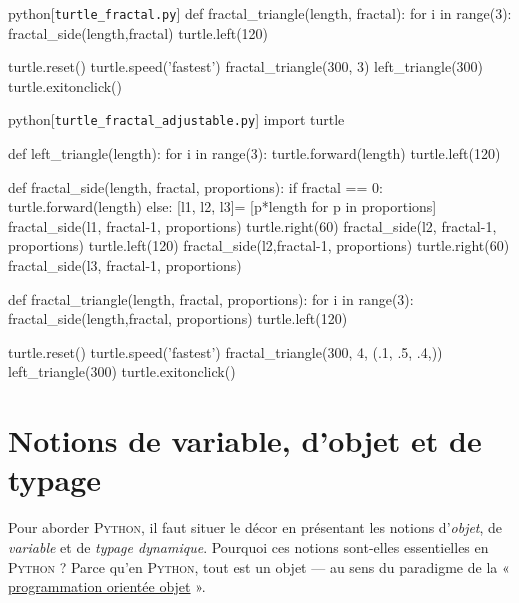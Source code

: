 \begin{solution}[ID=4]
\begin{listing}{python}[\texttt{turtle\_fractal.py}]
def fractal_triangle(length, fractal):
    for i in range(3):
        fractal_side(length,fractal)
        turtle.left(120)

turtle.reset()
turtle.speed('fastest')
fractal_triangle(300, 3)
left_triangle(300)
turtle.exitonclick()
\end{listing}

\begin{listing}{python}[\texttt{turtle\_fractal\_adjustable.py}]
import turtle

def left_triangle(length):
    for i in range(3):
        turtle.forward(length)
        turtle.left(120)

def fractal_side(length, fractal, proportions):
    if fractal == 0:
        turtle.forward(length)
    else:
        [l1, l2, l3]= [p*length for p in proportions]
        fractal_side(l1, fractal-1, proportions)
        turtle.right(60)
        fractal_side(l2, fractal-1, proportions)
        turtle.left(120)
        fractal_side(l2,fractal-1, proportions)
        turtle.right(60)
        fractal_side(l3, fractal-1, proportions)

def fractal_triangle(length, fractal, proportions):
    for i in range(3):
        fractal_side(length,fractal, proportions)
        turtle.left(120)

turtle.reset()
turtle.speed('fastest')
fractal_triangle(300, 4, (.1, .5, .4,))
left_triangle(300)
turtle.exitonclick()
\end{listing}
\end{solution}





\section[Variables, objets et typage]{Notions de variable, d'objet et de typage}
\label{sec:X.2}


Pour aborder \textsc{Python}, il faut situer le décor en présentant les notions d'\emph{objet}, de \emph{variable} et de \emph{typage dynamique}. Pourquoi ces notions sont-elles essentielles en \textsc{Python} ? Parce qu'en \textsc{Python}, tout est un objet --- au sens du paradigme de la « \href{https://fr.wikipedia.org/wiki/Programmation\_orient\%C3\%A9e\_objet}{programmation orientée objet} ».


